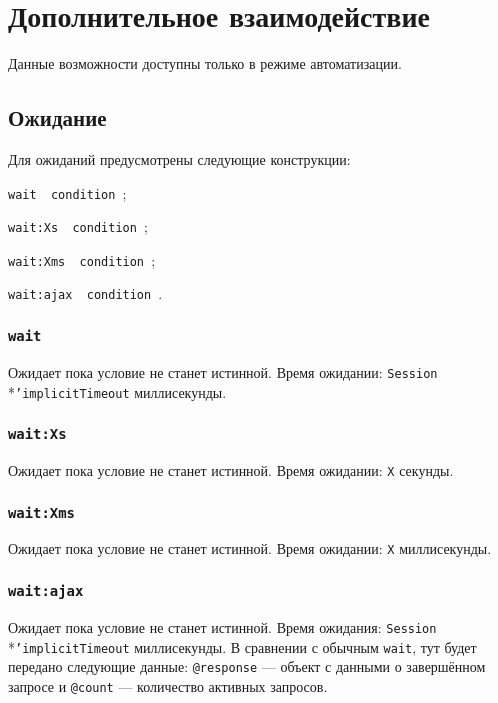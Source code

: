 \section{Дополнительное взаимодействие}

Данные возможности доступны только в режиме автоматизации.

\subsection{Ожидание}

Для ожиданий предусмотрены следующие конструкции:
\begin{icItems}
	\item \texttt{wait { condition }};
	\item \texttt{wait:Xs { condition }};
	\item \texttt{wait:Xms { condition }};
	\item \texttt{wait:ajax { condition }}.
\end{icItems}

\subsubsection{\texttt{wait}}

Ожидает пока условие не станет истинной. Время ожидании: \texttt{Session}\\*\texttt{'implicitTimeout} миллисекунды. 

\subsubsection{\texttt{wait:Xs}}

Ожидает пока условие не станет истинной. Время ожидании: \texttt{X} секунды. 

\subsubsection{\texttt{wait:Xms}}

Ожидает пока условие не станет истинной. Время ожидании: \texttt{X} миллисекунды. 

\subsubsection{\texttt{wait:ajax}}

Ожидает пока условие не станет истинной. Время ожидания: \texttt{Session}\\*\texttt{'implicitTimeout} миллисекунды. В сравнении с обычным \texttt{wait}, тут будет передано следующие данные: \texttt{@response} — объект с данными о завершённом запросе и \texttt{@count} — количество активных запросов.

